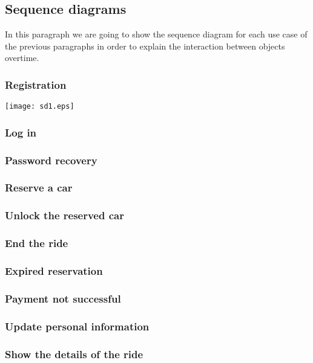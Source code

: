 \pagebreak
\subsection{Sequence diagrams}
In this paragraph we are going to show the sequence diagram for each use case of the previous paragraphs in order to explain the interaction between objects overtime.

\subsubsection{Registration}

\centerline{
	\texttt{[image: sd1.eps]}}




\subsubsection{Log in}
\subsubsection{Password recovery}
\subsubsection{Reserve a car}
\subsubsection{Unlock the reserved car}
\subsubsection{End the ride}
\subsubsection{Expired reservation}
\subsubsection{Payment not successful}
\subsubsection{Update personal information}
\subsubsection{Show the details of the ride}